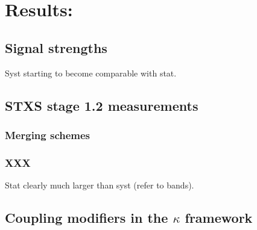 \chapter{Results: \Hgg}
\label{chap:hgg_results}

\section{Signal strengths}
Syst starting to become comparable with stat.

\section{STXS stage 1.2 measurements}
\subsection{Merging schemes}\label{sec:merging_schemes}

\subsection{XXX}
Stat clearly much larger than syst (refer to bands).

\section{Coupling modifiers in the $\kappa$ framework}\label{sec:results_kappa}

